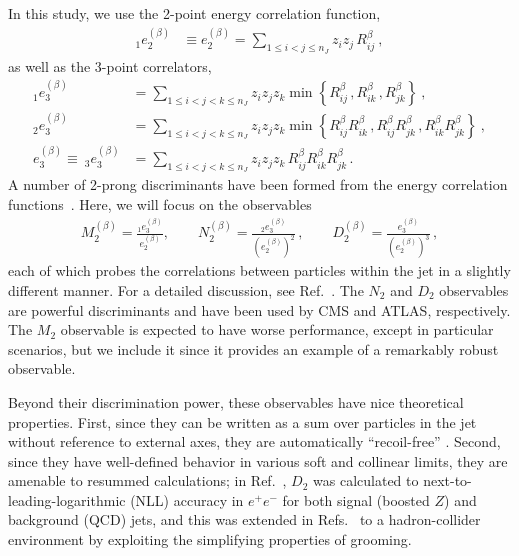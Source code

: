 In this study, we use the 2-point energy correlation function,
\begin{align}\label{eq:SM_jetsub_2prong:explicit_twopointvar}
_1e_2^{(\beta)}&\equiv e_2^{(\beta)}=\sum_{1\leq i<j\leq n_J} z_{i}z_{j} \, R_{ij}^\beta\ ,
\end{align}
as well as the 3-point correlators,
\begin{align}\label{eq:SM_jetsub_2prong:explicit_ecfvar}
_1e_{3}^{(\beta)}&=\sum_{1\leq i<j<k\leq n_J} z_{i}z_{j}z_{k} \min \left\{ R_{ij}^\beta\,,  R_{ik}^\beta\,, R_{jk}^\beta  \right\} \ , \nonumber \\
_2e_{3}^{(\beta)}&=\sum_{1\leq i<j<k\leq n_J} z_{i}z_{j}z_{k} \min \left\{R_{ij}^\beta R_{ik}^\beta\,, R_{ij}^\beta  R_{jk}^\beta\,,     R_{ik}^\beta R_{jk}^\beta    \right\}  \ , \nonumber \\
e_{3}^{(\beta)}\equiv ~_3e_{3}^{(\beta)}&=\sum_{1\leq i<j<k\leq n_J} z_{i}z_{j}z_{k} \, R_{ij}^\beta R_{ik}^\beta R_{jk}^\beta \,.
\end{align}
%
A number of 2-prong discriminants have been formed from the energy correlation functions~\cite{Larkoski:2013eya,Larkoski:2014gra,Larkoski:2014zma,Moult:2016cvt}.  Here, we will focus on the observables
\begin{align}
 M_2^{(\beta)} = \frac{_1e_{3}^{(\beta)}}{e_{2}^{(\beta)}}, \qquad  N_2^{(\beta)} = \frac{_2e_{3}^{(\beta)}}{(e_{2}^{(\beta)})^2}\,, \qquad  D_{2}^{(\beta)}=\frac{e_{3}^{(\beta)}}{(e_{2}^{(\beta)})^{3}}\,, 
\end{align}
each of which probes the correlations between particles within the jet in a slightly different manner.
%
For a detailed discussion, see Ref.~\cite{Moult:2016cvt}.
%
The $N_2$ and $D_2$ observables are powerful discriminants and have
been used by CMS and ATLAS, respectively.
%
The $M_2$ observable is expected to have worse performance, except in particular scenarios, but we include it since it provides an example of a remarkably robust observable.

Beyond their discrimination power, these observables have nice theoretical properties.
%
First, since they can be written as a sum over particles in the jet without reference to external axes, they are automatically ``recoil-free'' \cite{Catani:1992jc,Dokshitzer:1998kz,Banfi:2004yd,Larkoski:2013eya,Larkoski:2014uqa}.
%
Second, since they have well-defined behavior in various soft and collinear limits, they are amenable to resummed calculations;  in Ref.~\cite{Larkoski:2015kga}, $D_2$ was calculated to next-to-leading-logarithmic (NLL) accuracy in $e^+e^-$ for both signal (boosted $Z$) and background (QCD) jets, and this was extended in Refs.~\cite{Larkoski:2017iuy,Larkoski:2017cqq} to a hadron-collider environment by exploiting the simplifying properties of grooming.





